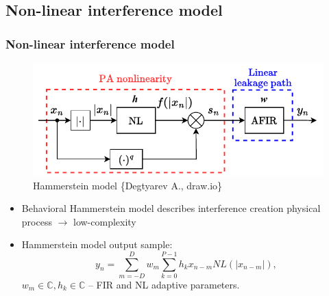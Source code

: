 \documentclass{beamer}
\begin{document}
\subsection{Non-linear interference model}
\begin{frame}
	\frametitle{Non-linear interference model}
	\begin{figure}[htbp]
		\centering
		\includegraphics[scale=0.7]{../figures/hammerstein/hammerstein.pdf}
		\caption{Hammerstein model \{Degtyarev A., draw.io\}}
	\end{figure}
	\begin{itemize}
		\item Behavioral Hammerstein model describes interference creation physical process $\rightarrow$ low-complexity
		\item Hammerstein model output sample:
	\begin{equation}
		y_n=\sum_{m=-D}^{D}w_m\sum_{k=0}^{P-1}h_k x_{n-m}NL(|x_{n-m}|),
		\label{hammerstein_output}
	\end{equation}
	$w_m\in\mathbb{C}, h_k\in\mathbb{C}$ -- FIR and NL adaptive parameters.
	\end{itemize}
\end{frame}
\end{document}
